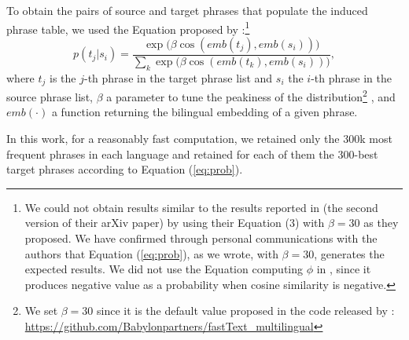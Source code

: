 \documentclass[11pt,a4paper]{article}
\newcommand{\Eq}[1]{{Equation (\ref{eq:#1})}}
\begin{document}
To obtain the pairs of source and target phrases that populate the induced phrase table, we used the Equation proposed by \citet{DBLP:journals/corr/abs-1804-07755}:\footnote{We could not obtain results similar to the results reported in \citet{DBLP:journals/corr/abs-1804-07755} (the second version of their arXiv paper) by using their Equation (3) with $\beta=30$ as they proposed.  We have confirmed through personal communications with the authors that \Eq{prob}, as we wrote, with $\beta=30$, generates the expected results. We did not use the Equation computing $\phi$ in \citet{artetxe2018unsupervised}, since it produces negative value as a probability when cosine similarity is negative.}
\begin{equation}
\label{eq:prob}
p(t_j|s_i) = \frac{\exp{(\beta\cos(emb(t_j),emb(s_i))})}{\sum_k{\exp{(\beta\cos(emb(t_k),emb(s_i))})}} ,
\end{equation}
where $t_j$ is the $j$-th phrase in the target phrase list
and $s_i$ the $i$-th phrase in the source phrase list, $\beta$ a parameter to tune the peakiness of the distribution\footnote{We set $\beta=30$ since it is the default value proposed in the code released by \citet{DBLP:journals/corr/SmithTHH17}: \url{https://github.com/Babylonpartners/fastText_multilingual}} \citep{DBLP:journals/corr/SmithTHH17}, and $emb(\cdot)$ a function returning the bilingual embedding of a given phrase.

In this work, for a reasonably fast computation, we retained only the 300k most frequent phrases in each language and retained for each of them the 300-best target phrases according to \Eq{prob}.
\end{document}
